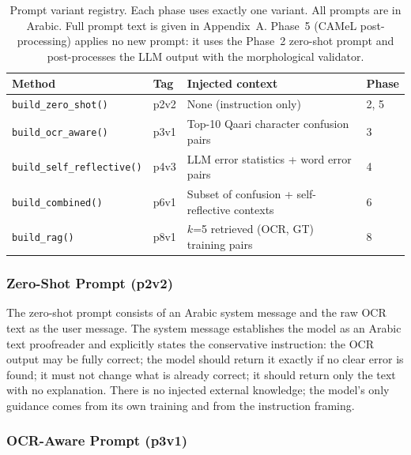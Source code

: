 \begin{table}[ht]
\caption{Prompt variant registry. Each phase uses exactly one variant.
         All prompts are in Arabic. Full prompt text is given in Appendix~A.
         Phase~5 (CAMeL post-processing) applies no new prompt: it uses the
         Phase~2 zero-shot prompt and post-processes the LLM output with the
         morphological validator.}
\label{tab:prompts}
\centering
\renewcommand{\arraystretch}{1.3}
\begin{tabularx}{\linewidth}{llXl}
\toprule
\textbf{Method} & \textbf{Tag} & \textbf{Injected context} & \textbf{Phase} \\
\midrule
\texttt{build\_zero\_shot()}       & p2v2  & None (instruction only)                        & 2, 5 \\
\texttt{build\_ocr\_aware()}       & p3v1  & Top-10 Qaari character confusion pairs          & 3    \\
\texttt{build\_self\_reflective()} & p4v3  & LLM error statistics + word error pairs         & 4    \\
\texttt{build\_combined()}         & p6v1  & Subset of confusion + self-reflective contexts  & 6    \\
\texttt{build\_rag()}              & p8v1  & $k$=5 retrieved (OCR, GT) training pairs       & 8    \\
\bottomrule
\end{tabularx}
\end{table}

\subsubsection{Zero-Shot Prompt (p2v2)}

The zero-shot prompt consists of an Arabic system message and the raw OCR text
as the user message.
The system message establishes the model as an Arabic text proofreader and
explicitly states the conservative instruction: the OCR output may be fully
correct; the model should return it exactly if no clear error is found; it must
not change what is already correct; it should return only the text with no
explanation.
There is no injected external knowledge; the model's only guidance comes from
its own training and from the instruction framing.

\subsubsection{OCR-Aware Prompt (p3v1)}

